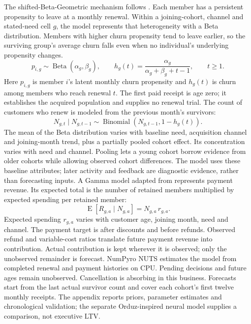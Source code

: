 \documentclass[10pt]{article}
\begin{document}
The shifted-Beta-Geometric mechanism follows . Each member has a persistent propensity to leave at a monthly renewal. Within a joining-cohort, channel and stated-need cell $g$, the model represents that heterogeneity with a Beta distribution. Members with higher churn propensity tend to leave earlier, so the surviving group's average churn falls even when no individual's underlying propensity changes.
\[
p_{i,g}\sim\operatorname{Beta}(\alpha_g,\beta_g),\qquad
h_g(t)=\frac{\alpha_g}{\alpha_g+\beta_g+t-1},\qquad t\geq1.
\]
Here $p_{i,g}$ is member $i$'s latent monthly churn propensity and $h_g(t)$ is churn among members who reach renewal $t$. The first paid receipt is age zero; it establishes the acquired population and supplies no renewal trial. The count of customers who renew is modeled from the previous month's survivors:
\[
N_{g,t}\mid N_{g,t-1}\sim\operatorname{Binomial}\!\left(N_{g,t-1},1-h_g(t)\right).
\]
The mean of the Beta distribution varies with baseline need, acquisition channel and joining-month trend, plus a partially pooled cohort effect. Its concentration varies with need and channel. Pooling lets a young cohort borrow evidence from older cohorts while allowing observed cohort differences. The model uses these baseline attributes; later activity and feedback are diagnostic evidence, rather than forecasting inputs.
A Gamma model adapted from  represents payment revenue. Its expected total is the number of retained members multiplied by expected spending per retained member:
\[
\operatorname{E}[R_{g,a}\mid N_{g,a}]=N_{g,a}\,r_{g,a}.
\]
Expected spending $r_{g,a}$ varies with customer age, joining month, need and channel. The payment target is after discounts and before refunds. Observed refund and variable-cost ratios translate future payment revenue into contribution. Actual contribution is kept wherever it is observed; only the unobserved remainder is forecast.
NumPyro NUTS estimates the model from completed renewal and payment histories on CPU. Pending decisions and future ages remain unobserved. Cancellation is absorbing in this business. Forecasts start from the last actual survivor count and cover each cohort's first twelve monthly receipts. The appendix reports priors, parameter estimates and chronological validation; the separate Orduz-inspired neural model supplies a comparison, not executive LTV.
\end{document}
